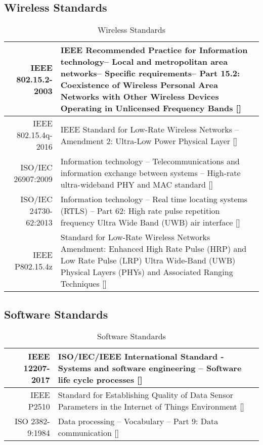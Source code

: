 \subsection{Wireless Standards}
\bgroup
\def\arraystretch{1.5}
\begin{table}[H]
\centering
\begin{tabular}{ | m{3.5cm} | m{11.5cm}| } 
\hline
\multicolumn{1}{|r|}{IEEE 802.15.2-2003} & IEEE Recommended Practice for Information technology-- Local and metropolitan area networks-- Specific requirements-- Part 15.2: Coexistence of Wireless Personal Area Networks with Other Wireless Devices Operating in Unlicensed Frequency Bands []\\ 
\hline
\multicolumn{1}{|r|}{IEEE 802.15.4q-2016} & IEEE Standard for Low-Rate Wireless Networks --Amendment 2: Ultra-Low Power Physical Layer []\\ 
\hline
\multicolumn{1}{|r|}{ISO/IEC 26907:2009} & Information technology -- Telecommunications and information exchange between systems -- High-rate ultra-wideband PHY and MAC standard []\\  
\hline
\multicolumn{1}{|r|}{ISO/IEC 24730-62:2013} & Information technology -- Real time locating systems (RTLS) -- Part 62: High rate pulse repetition frequency Ultra Wide Band (UWB) air interface []\\  
\hline
\multicolumn{1}{|r|}{IEEE P802.15.4z} & Standard for Low-Rate Wireless Networks Amendment: Enhanced High Rate Pulse (HRP) and Low Rate Pulse (LRP) Ultra Wide-Band (UWB) Physical Layers (PHYs) and Associated Ranging Techniques [] \\  
\hline
\end{tabular}
\caption{Wireless Standards}
\end{table}	


\pagebreak
\subsection{Software Standards}
\bgroup
\def\arraystretch{1.5}
\begin{table}[H]
\centering
\begin{tabular}{ | m{4cm} | m{12cm}| } 
\hline
\multicolumn{1}{|r|}{IEEE 12207-2017} & ISO/IEC/IEEE International Standard - Systems and software engineering -- Software life cycle processes []\\ 
\hline
\multicolumn{1}{|r|}{IEEE P2510} & Standard for Establishing Quality of Data Sensor Parameters in the Internet of Things Environment []\\ 
\hline
\multicolumn{1}{|r|}{ISO 2382-9:1984} & Data processing -- Vocabulary -- Part 9: Data communication []\\ 
\hline
\end{tabular}
\caption{Software Standards}
\end{table}	
\medskip

